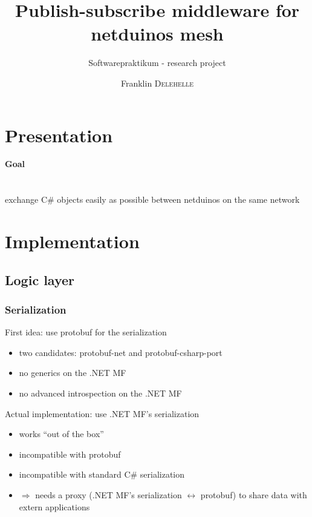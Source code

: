 \documentclass{beamer}
\title{Publish-subscribe middleware for netduinos mesh}
\subtitle{Softwarepraktikum - research project}
\author{Franklin \textsc{Delehelle}}
\date{}
\begin{document}
\begin{frame}
  \titlepage
\end{frame}

\section{Presentation}
\begin{frame}
\begin{center}
{\Large {\bfseries Goal}\\~\\~\\ exchange C\# objects easily as possible between netduinos on the same network}
\end{center}
\end{frame}


\section{Implementation}
\subsection{Logic layer}
\subsubsection{Serialization}
\begin{frame}
  \begin{block}{First idea: use protobuf for the serialization}
    \begin{itemize}
    \item two candidates: protobuf-net and protobuf-csharp-port
\pause
    \item no generics on the .NET MF
    \item no advanced introspection on the .NET MF
    \end{itemize}
  \end{block}
\pause
  \begin{block}{Actual implementation: use .NET MF's serialization}
    \begin{itemize}
    \item works ``out of the box''
    \item incompatible with protobuf
    \item incompatible with standard C\# serialization
\pause
    \item $\Rightarrow$ needs a proxy (.NET MF's serialization $\leftrightarrow$ protobuf) to share data with extern applications
    \end{itemize}
  \end{block}
\end{frame}
\end{document}
